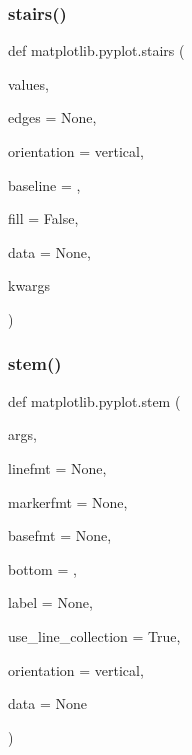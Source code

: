 \subsubsection{\texorpdfstring{stairs()}{stairs()}}
{\footnotesize\ttfamily def matplotlib.\+pyplot.\+stairs (\begin{DoxyParamCaption}\item[{}]{values,  }\item[{}]{edges = {\ttfamily None},  }\item[{}]{orientation = {\ttfamily \textquotesingle{}vertical\textquotesingle{}},  }\item[{}]{baseline = {},  }\item[{}]{fill = {\ttfamily False},  }\item[{}]{data = {\ttfamily None},  }\item[{}]{kwargs }\end{DoxyParamCaption})}

\mbox{\label{namespacematplotlib_1_1pyplot_a4c7b267caec137ccf2756d71264fd5c1}} 
\subsubsection{\texorpdfstring{stem()}{stem()}}
{\footnotesize\ttfamily def matplotlib.\+pyplot.\+stem (\begin{DoxyParamCaption}\item[{}]{args,  }\item[{}]{linefmt = {\ttfamily None},  }\item[{}]{markerfmt = {\ttfamily None},  }\item[{}]{basefmt = {\ttfamily None},  }\item[{}]{bottom = {},  }\item[{}]{label = {\ttfamily None},  }\item[{}]{use\+\_\+line\+\_\+collection = {\ttfamily True},  }\item[{}]{orientation = {\ttfamily \textquotesingle{}vertical\textquotesingle{}},  }\item[{}]{data = {\ttfamily None} }\end{DoxyParamCaption})}

\mbox{\label{namespacematplotlib_1_1pyplot_aca542311792dd05bf78c09dcfcb72ca0}} 
